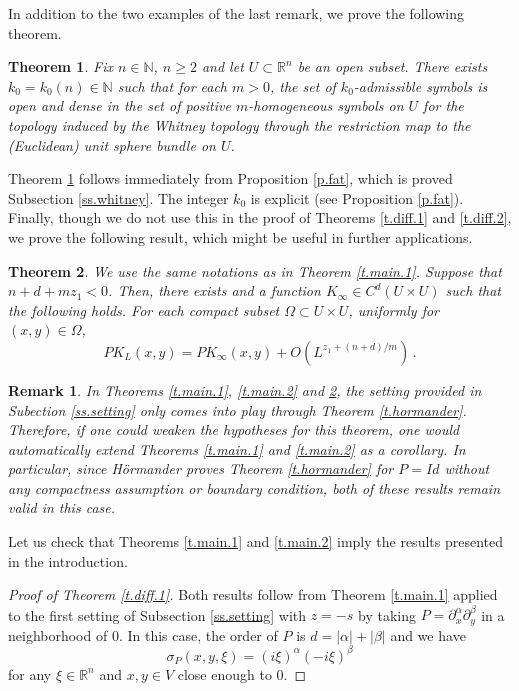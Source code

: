 \documentclass[10pt,twoside]{article}
\newcommand{\R}{\mathbb{R}}
\newcommand{\N}{\mathbb{N}}
\newtheorem{theorem}{Theorem}
\numberwithin{theorem}{section}
\newtheorem{remark}{Remark}
\begin{document}
In addition to the two examples of the last remark, we prove the following theorem.
\begin{theorem}\label{t.fat}
Fix $n\in\N$, $n\geq 2$ and let $U\subset\R^n$ be an open subset. There exists $k_0=k_0(n)\in\N$ such that for each $m>0$, the set of $k_0$-admissible symbols is open and dense in the set of positive $m$-homogeneous symbols on $U$ for the topology induced by the Whitney topology through the restriction map to the (Euclidean) unit sphere bundle on $U$.
\end{theorem}
Theorem \ref{t.fat} follows immediately from Proposition \ref{p.fat}, which is proved Subsection \ref{ss.whitney}. The integer $k_0$ is explicit (see Proposition \ref{p.fat}).\\

Finally, though we do not use this in the proof of Theorems \ref{t.diff.1} and \ref{t.diff.2}, we prove the following result, which might be useful in further applications.
\begin{theorem}\label{t.main.3}
We use the same notations as in Theorem \ref{t.main.1}. Suppose that $n+d+mz_1<0$. Then, there exists and a function $K_\infty\in C^d(U\times U)$ such that the following holds. For each compact subset $\Omega\subset U\times U$, uniformly for $(x,y)\in \Omega$,
\[
PK_L(x,y)=PK_\infty(x,y)+O\left(L^{z_1+(n+d)/m}\right)\, .
\]
\end{theorem}
\begin{remark}
In Theorems \ref{t.main.1}, \ref{t.main.2}  and \ref{t.main.3}, the setting provided in Subection \ref{ss.setting} only comes into play through Theorem \ref{t.hormander}. Therefore, if one could weaken the hypotheses for this theorem, one would automatically extend Theorems \ref{t.main.1} and \ref{t.main.2} as a corollary. In particular, since H\"ormander proves Theorem \ref{t.hormander} for $P=Id$ without any compactness assumption or boundary condition, both of these results remain valid in this case.
\end{remark}
Let us check that Theorems \ref{t.main.1} and \ref{t.main.2} imply the results presented in the introduction.
\begin{proof}[ Proof of Theorem \ref{t.diff.1}]
Both results follow from Theorem \ref{t.main.1} applied to the first setting of Subsection \ref{ss.setting} with $z=-s$ by taking $P=\partial^\alpha_x\partial^\beta_y$ in a neighborhood of $0$. In this case, the order of $P$ is $d=|\alpha|+|\beta|$ and we have
\[
\sigma_P(x,y,\xi)=(i\xi)^\alpha(-i\xi)^\beta
\]
for any $\xi\in\R^n$ and $x,y\in V$ close enough to $0$.
\end{proof}
\end{document}
